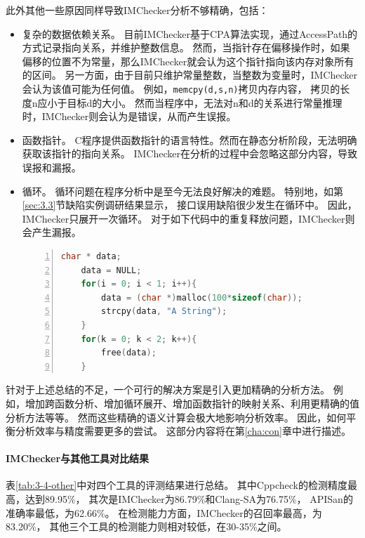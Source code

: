 此外其他一些原因同样导致IMChecker分析不够精确，包括：
\begin{itemize}
	\item 复杂的数据依赖关系。
	目前IMChecker基于CPA算法实现，通过AccessPath的方式记录指向关系，并维护整数信息。
	然而，当指针存在偏移操作时，如果偏移的位置不为常量，那么IMChecker就会认为这个指针指向该内存对象所有的区间。
	另一方面，由于目前只维护常量整数，当整数为变量时，IMChecker会认为该值可能为任何值。
	例如，\texttt{memcpy(d,s,n)}拷贝内存内容，
	拷贝的长度n应小于目标d的大小。
	然而当程序中，无法对n和d的关系进行常量推理时，IMChecker则会认为是错误，从而产生误报。
	\item 函数指针。
	C程序提供函数指针的语言特性。然而在静态分析阶段，无法明确获取该指针的指向关系。
	IMChecker在分析的过程中会忽略这部分内容，导致误报和漏报。
	\item 循环。
	循环问题在程序分析中是至今无法良好解决的难题。
	特别地，如第\ref{sec:3.3}节缺陷实例调研结果显示，
	接口误用缺陷很少发生在循环中。
	因此，IMChecker只展开一次循环。
	对于如下代码中的重复释放问题，IMChecker则会产生漏报。
\begin{lstlisting}[language={C},
basicstyle=\linespread{0.7}\listingsfont,
numbers=left,
xleftmargin=.2\textwidth]
	char * data;
	data = NULL;
	for(i = 0; i < 1; i++){
		data = (char *)malloc(100*sizeof(char));
		strcpy(data, "A String");
	}
	for(k = 0; k < 2; k++){
		free(data);
	}
\end{lstlisting}	
\end{itemize}

针对于上述总结的不足，一个可行的解决方案是引入更加精确的分析方法。
例如，增加跨函数分析、增加循环展开、增加函数指针的映射关系、利用更精确的值分析方法等等。
然而这些精确的语义计算会极大地影响分析效率。
因此，如何平衡分析效率与精度需要更多的尝试。
这部分内容将在第\ref{cha:con}章中进行描述。

\paragraph{IMChecker与其他工具对比结果}



表\ref{tab:3-4-other}中对四个工具的评测结果进行总结。
其中Cppcheck的检测精度最高，达到89.95\%，
其次是IMChecker为86.79\%和Clang-SA为76.75\%，
APISan的准确率最低，为62.66\%。
在检测能力方面，IMChecker的召回率最高，为83.20\%，
其他三个工具的检测能力则相对较低，在30-35\%之间。

